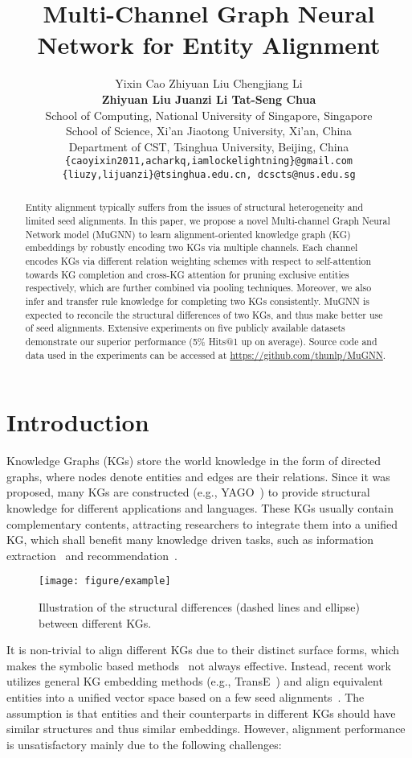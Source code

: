 \documentclass[11pt,a4paper]{article}
\title{Multi-Channel Graph Neural Network for Entity Alignment}
\author{Yixin Cao \quad Zhiyuan Liu \quad Chengjiang Li\\
\textbf{Zhiyuan Liu \quad Juanzi Li \quad Tat-Seng Chua}\\
School of Computing, National University of Singapore, Singapore\\
School of Science, Xi'an Jiaotong University, Xi'an, China\\
Department of CST, Tsinghua University, Beijing, China\\
{\tt \{caoyixin2011,acharkq,iamlockelightning\}@gmail.com} \\
{\tt \{liuzy,lijuanzi\}@tsinghua.edu.cn, dcscts@nus.edu.sg} \\
}
\date{}
\begin{document}
\maketitle
\begin{abstract}
  Entity alignment typically suffers from the issues of structural heterogeneity and limited seed alignments. In this paper, we propose a novel Multi-channel Graph Neural Network model (MuGNN) to learn alignment-oriented knowledge graph (KG) embeddings by robustly encoding two KGs via multiple channels. Each channel encodes KGs via different relation weighting schemes with respect to self-attention towards KG completion and cross-KG attention for pruning exclusive entities respectively, which are further combined via pooling techniques. Moreover, we also infer and transfer rule knowledge for completing two KGs consistently. MuGNN is expected to reconcile the structural differences of two KGs, and thus make better use of seed alignments. Extensive experiments on five publicly available datasets demonstrate our superior performance (5\% Hits@1 up on average). Source code and data used in the experiments can be accessed at \url{https://github.com/thunlp/MuGNN}.
\end{abstract}

\section{Introduction}
\label{sec:intro}
Knowledge Graphs (KGs) store the world knowledge in the form of directed graphs, where nodes denote entities and edges are their relations. Since it was proposed, many KGs are constructed (e.g., YAGO~\cite{rebele2016yago}) to provide structural knowledge for different applications and languages. These KGs usually contain complementary contents, attracting researchers to integrate them into a unified KG, which shall benefit many knowledge driven tasks, such as information extraction~\cite{cao2018neural} and recommendation~\cite{wang2018explainable}.

\begin{figure}[htb]
	\centerline{\texttt{[image: figure/example]}}
	\caption{Illustration of the structural differences (dashed lines and ellipse) between different KGs.}
	\label{fig:example}
\end{figure}

It is non-trivial to align different KGs due to their distinct surface forms, which makes the symbolic based methods~\cite{suchanek2011paris} not always effective. Instead, recent work utilizes general KG embedding methods (e.g., TransE~\cite{bordes2013translating}) and align equivalent entities into a unified vector space based on a few seed alignments~\cite{chen2016multilingual,sun2017cross,zhu2017iterative,chen2018co,sun2018bootstrapping,wang2018cross}. The assumption is that entities and their counterparts in different KGs should have similar structures and thus similar embeddings. However, alignment performance is unsatisfactory mainly due to the following challenges:
\end{document}
